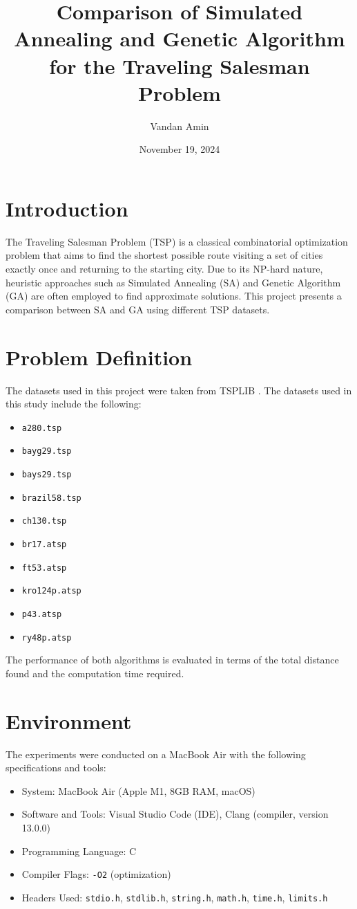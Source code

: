 \documentclass{article}
\title{Comparison of Simulated Annealing and Genetic Algorithm for the Traveling Salesman Problem}
\author{Vandan Amin}
\date{November 19, 2024}
\begin{document}
\maketitle

\section{Introduction}
The Traveling Salesman Problem (TSP) is a classical combinatorial optimization problem that aims to find the shortest possible route visiting a set of cities exactly once and returning to the starting city. Due to its NP-hard nature, heuristic approaches such as Simulated Annealing (SA) and Genetic Algorithm (GA) are often employed to find approximate solutions. This project presents a comparison between SA and GA using different TSP datasets. 


\section{Problem Definition}
The datasets used in this project were taken from TSPLIB \cite{tsplib}. The datasets used in this study include the following:
\begin{itemize}
    \item \texttt{a280.tsp}
    \item \texttt{bayg29.tsp}
    \item \texttt{bays29.tsp}
    \item \texttt{brazil58.tsp}
    \item \texttt{ch130.tsp}
    \item \texttt{br17.atsp}
    \item \texttt{ft53.atsp}
    \item \texttt{kro124p.atsp}
    \item \texttt{p43.atsp}
    \item \texttt{ry48p.atsp}
\end{itemize}
The performance of both algorithms is evaluated in terms of the total distance found and the computation time required.

\section{Environment}
The experiments were conducted on a MacBook Air with the following specifications and tools:
\begin{itemize}
    \item System: MacBook Air (Apple M1, 8GB RAM, macOS)
    \item Software and Tools: Visual Studio Code (IDE), Clang (compiler, version 13.0.0)
    \item Programming Language: C
    \item Compiler Flags: \texttt{-O2} (optimization)
    \item Headers Used: \texttt{stdio.h}, \texttt{stdlib.h}, \texttt{string.h}, \texttt{math.h}, \texttt{time.h}, \texttt{limits.h}
\end{itemize}
\end{document}
